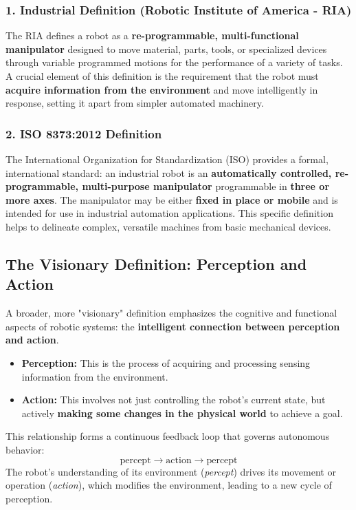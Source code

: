 \documentclass[10pt, letterpaper]{report}
\begin{document}
\subsubsection*{1. Industrial Definition (Robotic Institute of America - RIA)}
The RIA defines a robot as a \textbf{re-programmable, multi-functional manipulator} designed to move material, parts, tools, or specialized devices through variable programmed motions for the performance of a variety of tasks. A crucial element of this definition is the requirement that the robot must \textbf{acquire information from the environment} and move intelligently in response, setting it apart from simpler automated machinery.

\subsubsection*{2. ISO 8373:2012 Definition}
The International Organization for Standardization (ISO) provides a formal, international standard: an industrial robot is an \textbf{automatically controlled, re-programmable, multi-purpose manipulator} programmable in \textbf{three or more axes}. The manipulator may be either \textbf{fixed in place or mobile} and is intended for use in industrial automation applications. This specific definition helps to delineate complex, versatile machines from basic mechanical devices.

\subsection{The Visionary Definition: Perception and Action}
A broader, more "visionary" definition emphasizes the cognitive and functional aspects of robotic systems: the \textbf{intelligent connection between perception and action}.

\begin{itemize}
    \item \textbf{Perception:} This is the process of acquiring and processing sensing information from the environment.
    \item \textbf{Action:} This involves not just controlling the robot's current state, but actively \textbf{making some changes in the physical world} to achieve a goal.
\end{itemize}

This relationship forms a continuous feedback loop that governs autonomous behavior:
$$\text{percept} \longrightarrow \text{action} \longrightarrow \text{percept}$$
The robot's understanding of its environment (\textit{percept}) drives its movement or operation (\textit{action}), which modifies the environment, leading to a new cycle of perception.
\end{document}
